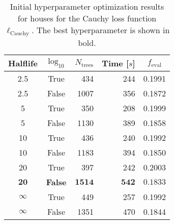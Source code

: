 \begin{table}[h!]
  \centerfloat
  \begin{tabular}{@{}ccrrc@{}}
    Halflife & $\log_{10}$ & $N_\mathrm{trees}$ & Time [$s$] & $f_\mathrm{eval}$ \\
    \midrule
    \num{2.5} & True & \num{434} & \num{244} & \num{0.1991} \\
    \num{2.5} & False & \num{1007} & \num{356} & \num{0.1872} \\
    \num{5} & True & \num{350} & \num{208} & \num{0.1999} \\
    \num{5} & False & \num{1130} & \num{389} & \num{0.1858} \\
    \num{10} & True & \num{436} & \num{240} & \num{0.1992} \\
    \num{10} & False & \num{1183} & \num{394} & \num{0.1850} \\
    \num{20} & True & \num{397} & \num{242} & \num{0.2003} \\
    $\mathbf{20}$ & \textbf{False} & $\mathbf{1514}$ & $\mathbf{542}$ & $\mathbf{0.1833}$ \\
    $\infty$ & True & \num{449} & \num{257} & \num{0.1992} \\
    $\infty$ & False & \num{1351} & \num{470} & \num{0.1844} \\
  \end{tabular}
  \caption[Initial Hyperparameter Optimization Results for Houses -- Cauchy Loss Function]{\label{tab:h:HPO_initial_Cauchy-villa-appendix}Initial hyperparameter optimization results for houses for the Cauchy loss function $\ell_\mathrm{Cauchy}$. The best hyperparameter is shown in bold.}
\end{table}


